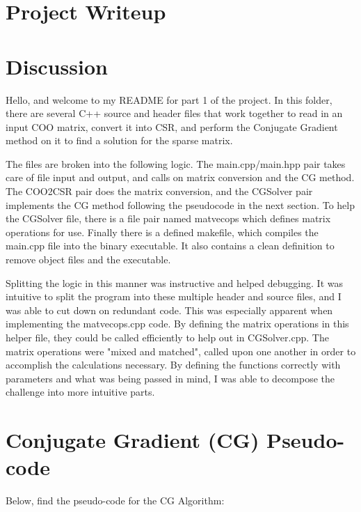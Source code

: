 \documentclass{article}
\begin{document}
\section*{Project Writeup}

\section{Discussion}


Hello, and welcome to my README for part 1 of the project. In this folder, there are several C++ source and header files that work together to read in an input COO matrix, convert it into CSR, and perform the Conjugate Gradient method on it to find a solution for the sparse matrix. 

The files are broken into the following logic. The main.cpp/main.hpp pair takes care of file input and output, and calls on matrix conversion and the CG method. The COO2CSR pair does the matrix conversion, and the CGSolver pair implements the CG method following the pseudocode in the next section. To help the CGSolver file, there is a file pair named matvecops which defines matrix operations for use. Finally there is a defined makefile, which compiles the main.cpp file into the binary executable. It also contains a clean definition to remove object files and the executable.

Splitting the logic in this manner was instructive and helped debugging. It was intuitive to split the program into these multiple header and source files, and I was able to cut down on redundant code. This was especially apparent when implementing the matvecops.cpp code. By defining the matrix operations in this helper file, they could be called efficiently to help out in CGSolver.cpp. The matrix operations were "mixed and matched", called upon one another in order to accomplish the calculations necessary. By defining the functions correctly with parameters and what was being passed in mind, I was able to decompose the challenge into more intuitive parts.

\section{Conjugate Gradient (CG) Pseudo-code}

Below, find the pseudo-code for the CG Algorithm:
\end{document}
